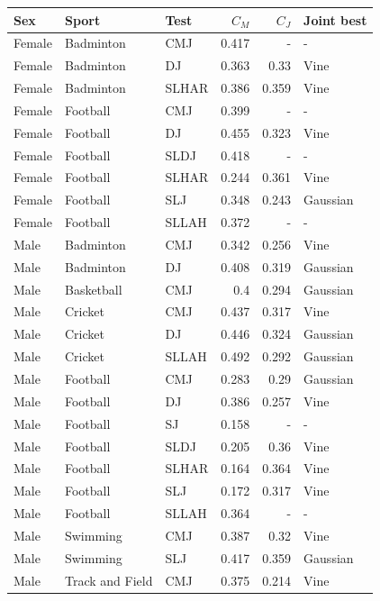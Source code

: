 \begin{tabular}{lllrrl}
\toprule
Sex & Sport & Test & $C_M$ & $C_J$ & Joint best \\
\midrule
Female & Badminton & CMJ & 0.417 & - & - \\
Female & Badminton & DJ & 0.363 & 0.33 & Vine \\
Female & Badminton & SLHAR & 0.386 & 0.359 & Vine \\
Female & Football & CMJ & 0.399 & - & - \\
Female & Football & DJ & 0.455 & 0.323 & Vine \\
Female & Football & SLDJ & 0.418 & - & - \\
Female & Football & SLHAR & 0.244 & 0.361 & Vine \\
Female & Football & SLJ & 0.348 & 0.243 & Gaussian \\
Female & Football & SLLAH & 0.372 & - & - \\
Male & Badminton & CMJ & 0.342 & 0.256 & Vine \\
Male & Badminton & DJ & 0.408 & 0.319 & Gaussian \\
Male & Basketball & CMJ & 0.4 & 0.294 & Gaussian \\
Male & Cricket & CMJ & 0.437 & 0.317 & Vine \\
Male & Cricket & DJ & 0.446 & 0.324 & Gaussian \\
Male & Cricket & SLLAH & 0.492 & 0.292 & Gaussian \\
Male & Football & CMJ & 0.283 & 0.29 & Gaussian \\
Male & Football & DJ & 0.386 & 0.257 & Vine \\
Male & Football & SJ & 0.158 & - & - \\
Male & Football & SLDJ & 0.205 & 0.36 & Vine \\
Male & Football & SLHAR & 0.164 & 0.364 & Vine \\
Male & Football & SLJ & 0.172 & 0.317 & Vine \\
Male & Football & SLLAH & 0.364 & - & - \\
Male & Swimming & CMJ & 0.387 & 0.32 & Vine \\
Male & Swimming & SLJ & 0.417 & 0.359 & Gaussian \\
Male & Track and Field & CMJ & 0.375 & 0.214 & Vine \\
\bottomrule
\end{tabular}
